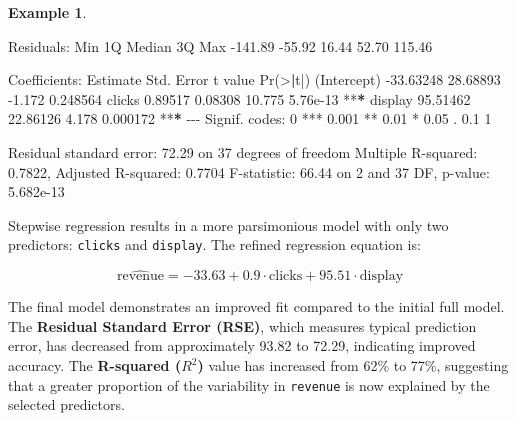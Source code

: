 \documentclass[
  11pt,
]{book}
\makeatletter
\newenvironment{Shaded}{}{}
\newcommand{\DecValTok}[1]{#1}
\newcommand{\ErrorTok}[1]{\textcolor[rgb]{0.21,0.21,0.21}{\textbf{#1}}}
\newcommand{\FloatTok}[1]{#1}
\newcommand{\FunctionTok}[1]{#1}
\newcommand{\NormalTok}[1]{#1}
\newcommand{\SpecialCharTok}[1]{\textcolor[rgb]{0.39,0.39,0.39}{#1}}
\newcommand{\StringTok}[1]{\textcolor[rgb]{0.39,0.39,0.39}{#1}}
\newenvironment{kframe}{%
\medskip{}
\setlength{\fboxsep}{.8em}
 \def\at@end@of@kframe{}%
 \ifinner\ifhmode%
  \def\at@end@of@kframe{\end{minipage}}%
  \begin{minipage}{\columnwidth}%
 \fi\fi%
 \def\FrameCommand##1{\hskip\@totalleftmargin \hskip-\fboxsep
 \colorbox{shadecolor}{##1}\hskip-\fboxsep
     \hskip-\linewidth \hskip-\@totalleftmargin \hskip\columnwidth}%
 \MakeFramed {\advance\hsize-\width
   \@totalleftmargin\z@ \linewidth\hsize
   \@setminipage}}%
 {\par\unskip\endMakeFramed%
 \at@end@of@kframe}
\renewenvironment{Shaded}{\begin{kframe}}{\end{kframe}}
\theoremstyle{definition}
\theoremstyle{definition}
\newtheorem{example}{Example}[chapter]
\theoremstyle{definition}
\theoremstyle{definition}
\theoremstyle{remark}
\makeatother
\begin{document}
\begin{example}
\begin{Shaded}
\begin{Highlighting}[]
\NormalTok{   Residuals}\SpecialCharTok{:}
\NormalTok{       Min      }\DecValTok{1}\NormalTok{Q  Median      }\DecValTok{3}\NormalTok{Q     Max }
   \SpecialCharTok{{-}}\FloatTok{141.89}  \SpecialCharTok{{-}}\FloatTok{55.92}   \FloatTok{16.44}   \FloatTok{52.70}  \FloatTok{115.46} 
   
\NormalTok{   Coefficients}\SpecialCharTok{:}
\NormalTok{                Estimate Std. Error t value }\FunctionTok{Pr}\NormalTok{(}\SpecialCharTok{\textgreater{}}\ErrorTok{|}\NormalTok{t}\SpecialCharTok{|}\NormalTok{)    }
\NormalTok{   (Intercept) }\SpecialCharTok{{-}}\FloatTok{33.63248}   \FloatTok{28.68893}  \SpecialCharTok{{-}}\FloatTok{1.172} \FloatTok{0.248564}    
\NormalTok{   clicks        }\FloatTok{0.89517}    \FloatTok{0.08308}  \FloatTok{10.775} \FloatTok{5.76e{-}13} \SpecialCharTok{**}\ErrorTok{*}
\NormalTok{   display      }\FloatTok{95.51462}   \FloatTok{22.86126}   \FloatTok{4.178} \FloatTok{0.000172} \SpecialCharTok{**}\ErrorTok{*}
   \SpecialCharTok{{-}{-}{-}}
\NormalTok{   Signif. codes}\SpecialCharTok{:}  \DecValTok{0} \StringTok{\textquotesingle{}***\textquotesingle{}} \FloatTok{0.001} \StringTok{\textquotesingle{}**\textquotesingle{}} \FloatTok{0.01} \StringTok{\textquotesingle{}*\textquotesingle{}} \FloatTok{0.05} \StringTok{\textquotesingle{}.\textquotesingle{}} \FloatTok{0.1} \StringTok{\textquotesingle{} \textquotesingle{}} \DecValTok{1}
   
\NormalTok{   Residual standard error}\SpecialCharTok{:} \FloatTok{72.29}\NormalTok{ on }\DecValTok{37}\NormalTok{ degrees of freedom}
\NormalTok{   Multiple R}\SpecialCharTok{{-}}\NormalTok{squared}\SpecialCharTok{:}  \FloatTok{0.7822}\NormalTok{, Adjusted R}\SpecialCharTok{{-}}\NormalTok{squared}\SpecialCharTok{:}  \FloatTok{0.7704} 
\NormalTok{   F}\SpecialCharTok{{-}}\NormalTok{statistic}\SpecialCharTok{:} \FloatTok{66.44}\NormalTok{ on }\DecValTok{2}\NormalTok{ and }\DecValTok{37}\NormalTok{ DF,  p}\SpecialCharTok{{-}}\NormalTok{value}\SpecialCharTok{:} \FloatTok{5.682e{-}13}
\end{Highlighting}
\end{Shaded}

Stepwise regression results in a more parsimonious model with only two predictors: \texttt{clicks} and \texttt{display}. The refined regression equation is:

\[
\hat{\text{revenue}} = -33.63 + 0.9 \cdot \text{clicks} + 95.51 \cdot \text{display}
\]

The final model demonstrates an improved fit compared to the initial full model. The \textbf{Residual Standard Error (RSE)}, which measures typical prediction error, has decreased from approximately 93.82 to 72.29, indicating improved accuracy. The \textbf{R-squared (\(R^2\))} value has increased from 62\% to 77\%, suggesting that a greater proportion of the variability in \texttt{revenue} is now explained by the selected predictors.
\end{example}
\end{document}
